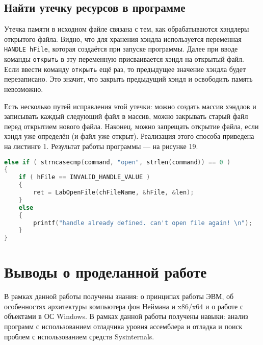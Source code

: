 \FloatBarrier


\subsection{Найти утечку ресурсов в программе}
Утечка памяти в исходном файле связана с тем, как обрабатываются хэндлеры открытого файла. Видно, что для хранения хэндла используется переменная \texttt{HANDLE hFile}, которая создаётся при запуске программы. Далее при вводе команды \texttt{открыть} в эту переменную присваивается хэндл на открытый файл. Если ввести команду \texttt{открыть} ещё раз, то предыдущее значение хэндла будет перезаписано. Это значит, что закрыть предыдущий хэндл и освободить память невозможно. 

Есть несколько путей исправления этой утечки: можно создать массив хэндлов и записывать каждый следующий файл в массив, можно закрывать старый файл перед открытием нового файла. Наконец, можно запрещать открытие файла, если хэндл уже определён (и файл уже открыт). Реализация этого способа приведена на листинге 1. Результат работы программы — на рисунке 19.

\begin{lstlisting}[language=c, numbers=none, caption={Фрагмент функции main}]
else if ( strncasecmp(command, "open", strlen(command)) == 0 )
{
    if ( hFile == INVALID_HANDLE_VALUE )
    {
        ret = LabOpenFile(chFileName, &hFile, &len);
    } 
    else 
    {
        printf("handle already defined. can't open file again! \n");
    }
}
\end{lstlisting}

\FloatBarrier



\clearpage






\clearpage



\section{Выводы о проделанной работе}
В рамках данной работы получены знания: о принципах работы ЭВМ, об особенностях архитектуры компьютера фон Неймана и x86/x64 и о работе с объектами в ОС Windows.
В рамках данной работы получены навыки: анализ программ с использованием отладчика уровня ассемблера и отладка и поиск проблем с использованием средств Sysinternals.